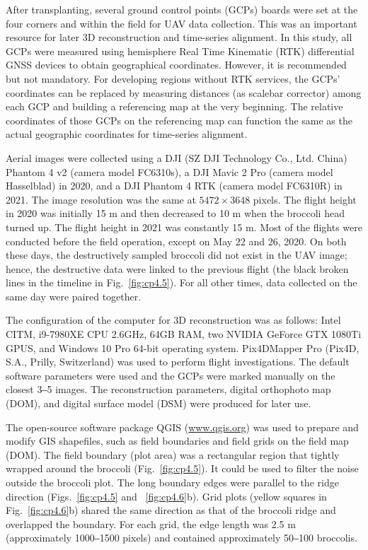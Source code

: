 After transplanting, several ground control points (GCPs) boards were set at the four corners and within the field for UAV data collection. This was an important resource for later 3D reconstruction and time-series alignment. In this study, all GCPs were measured using hemisphere Real Time Kinematic (RTK) differential GNSS devices to obtain geographical coordinates. However, it is recommended but not mandatory. For developing regions without RTK services, the GCPs' coordinates can be replaced by measuring distances (as scalebar corrector) among each GCP and building a referencing map at the very beginning. The relative coordinates of those GCPs on the referencing map can function the same as the actual geographic coordinates for time-series alignment.

Aerial images were collected using a DJI (SZ DJI Technology Co., Ltd. China) Phantom 4 v2 (camera model FC6310s), a DJI Mavic 2 Pro (camera model Hasselblad) in 2020, and a DJI Phantom 4 RTK (camera model FC6310R) in 2021. The image resolution was the same at $5472 \times 3648$ pixels. The flight height in 2020 was initially 15 m and then decreased to 10 m when the broccoli head turned up. The flight height in 2021 was constantly 15 m. Most of the flights were conducted before the field operation, except on May 22 and 26, 2020. On both these days, the destructively sampled broccoli did not exist in the UAV image; hence, the destructive data were linked to the previous flight (the black broken lines in the timeline in Fig.~\ref{fig:cp4.5}). For all other times, data collected on the same day were paired together.

The configuration of the computer for 3D reconstruction was as follows: Intel CITM, i9-7980XE CPU \@2.6GHz, 64GB RAM, two NVIDIA GeForce GTX 1080Ti GPUS, and Windows 10 Pro 64-bit operating system. Pix4DMapper Pro (Pix4D, S.A., Prilly, Switzerland) was used to perform flight investigations. The default software parameters were used and the GCPs were marked manually on the closest 3‒5 images. The reconstruction parameters, digital orthophoto map (DOM), and digital surface model (DSM) were produced for later use. 

The open-source software package QGIS (\url{www.qgis.org}) was used to prepare and modify GIS shapefiles, such as field boundaries and field grids on the field map (DOM). The field boundary (plot area) was a rectangular region that tightly wrapped around the broccoli (Fig.~\ref{fig:cp4.5}). It could be used to filter the noise outside the broccoli plot. The long boundary edges were parallel to the ridge direction (Figs.~\ref{fig:cp4.5} and ~\ref{fig:cp4.6}b). Grid plots (yellow squares in Fig.~\ref{fig:cp4.6}b) shared the same direction as that of the broccoli ridge and overlapped the boundary. For each grid, the edge length was 2.5 m (approximately 1000‒1500 pixels) and contained approximately 50‒100 broccolis. 

